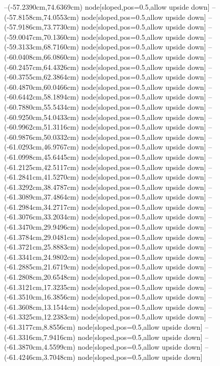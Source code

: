 --(-57.2390cm,74.6369cm) node[sloped,pos=0.5,allow upside down]{\ArrowIn}
--(-57.8158cm,74.0553cm) node[sloped,pos=0.5,allow upside down]{\arrowIn}
--(-57.9186cm,73.7730cm) node[sloped,pos=0.5,allow upside down]{\arrowIn}
--(-59.0047cm,70.1360cm) node[sloped,pos=0.5,allow upside down]{\ArrowIn}
--(-59.3133cm,68.7160cm) node[sloped,pos=0.5,allow upside down]{\ArrowIn}
--(-60.0408cm,66.0860cm) node[sloped,pos=0.5,allow upside down]{\ArrowIn}
--(-60.2457cm,64.4326cm) node[sloped,pos=0.5,allow upside down]{\ArrowIn}
--(-60.3755cm,62.3864cm) node[sloped,pos=0.5,allow upside down]{\ArrowIn}
--(-60.4870cm,60.0466cm) node[sloped,pos=0.5,allow upside down]{\ArrowIn}
--(-60.6442cm,58.1894cm) node[sloped,pos=0.5,allow upside down]{\ArrowIn}
--(-60.7880cm,55.5434cm) node[sloped,pos=0.5,allow upside down]{\ArrowIn}
--(-60.9250cm,54.0433cm) node[sloped,pos=0.5,allow upside down]{\ArrowIn}
--(-60.9962cm,51.3116cm) node[sloped,pos=0.5,allow upside down]{\ArrowIn}
--(-60.9876cm,50.0332cm) node[sloped,pos=0.5,allow upside down]{\ArrowIn}
--(-61.0293cm,46.9767cm) node[sloped,pos=0.5,allow upside down]{\ArrowIn}
--(-61.0998cm,45.6445cm) node[sloped,pos=0.5,allow upside down]{\ArrowIn}
--(-61.2125cm,42.5117cm) node[sloped,pos=0.5,allow upside down]{\ArrowIn}
--(-61.2841cm,41.5270cm) node[sloped,pos=0.5,allow upside down]{\arrowIn}
--(-61.3292cm,38.4787cm) node[sloped,pos=0.5,allow upside down]{\ArrowIn}
--(-61.3089cm,37.4864cm) node[sloped,pos=0.5,allow upside down]{\arrowIn}
--(-61.2984cm,34.2717cm) node[sloped,pos=0.5,allow upside down]{\ArrowIn}
--(-61.3076cm,33.2034cm) node[sloped,pos=0.5,allow upside down]{\ArrowIn}
--(-61.3470cm,29.9496cm) node[sloped,pos=0.5,allow upside down]{\ArrowIn}
--(-61.3784cm,29.0481cm) node[sloped,pos=0.5,allow upside down]{\arrowIn}
--(-61.3721cm,25.8883cm) node[sloped,pos=0.5,allow upside down]{\ArrowIn}
--(-61.3341cm,24.9802cm) node[sloped,pos=0.5,allow upside down]{\arrowIn}
--(-61.2885cm,21.6719cm) node[sloped,pos=0.5,allow upside down]{\ArrowIn}
--(-61.2808cm,20.6548cm) node[sloped,pos=0.5,allow upside down]{\ArrowIn}
--(-61.3121cm,17.3235cm) node[sloped,pos=0.5,allow upside down]{\ArrowIn}
--(-61.3510cm,16.3856cm) node[sloped,pos=0.5,allow upside down]{\arrowIn}
--(-61.3608cm,13.1544cm) node[sloped,pos=0.5,allow upside down]{\ArrowIn}
--(-61.3325cm,12.2383cm) node[sloped,pos=0.5,allow upside down]{\arrowIn}
--(-61.3177cm,8.8556cm) node[sloped,pos=0.5,allow upside down]{\ArrowIn}
--(-61.3316cm,7.9416cm) node[sloped,pos=0.5,allow upside down]{\arrowIn}
--(-61.3870cm,4.5599cm) node[sloped,pos=0.5,allow upside down]{\ArrowIn}
--(-61.4246cm,3.7048cm) node[sloped,pos=0.5,allow upside down]{\arrowIn}
